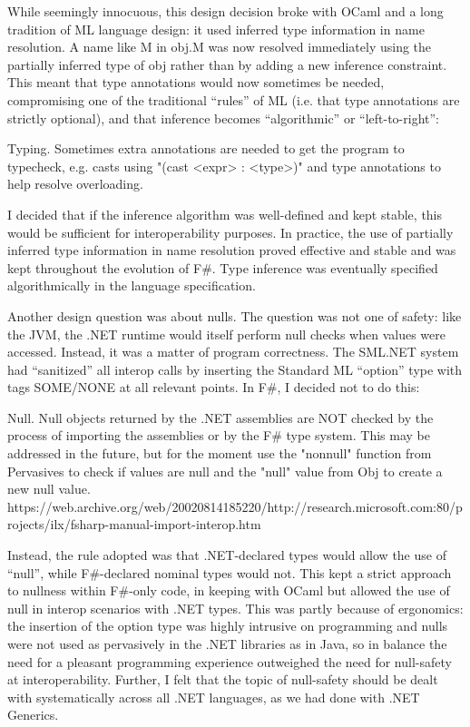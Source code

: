 \documentclass[acmsmall,review]{acmart}\settopmatter{printfolios=true,printccs=false,printacmref=false}
\begin{document}
While seemingly innocuous, this design decision broke with OCaml and a long tradition of ML language design: it used inferred type information in name resolution. A name like M in obj.M was now resolved immediately using the partially inferred type of obj rather than by adding a new inference constraint. This meant that type annotations would now sometimes be needed, compromising one of the traditional “rules” of ML (i.e. that type annotations are strictly optional), and that inference becomes “algorithmic” or “left-to-right”:

\begin{verbquote}
Typing. Sometimes extra annotations are needed to get the program to typecheck, e.g. casts using "(cast <expr> : <type>)" and type annotations to help resolve overloading.
\end{verbquote}

I decided that if the inference algorithm was well-defined and kept stable, this would be sufficient for interoperability purposes. In practice, the use of partially inferred type information in name resolution proved effective and stable and was kept throughout the evolution of F\#.  Type inference was eventually specified algorithmically in the language specification. 

Another design question was about nulls. The question was not one of safety: like the JVM, the .NET runtime would itself perform null checks when values were accessed. Instead, it was a matter of program correctness. The SML.NET system had “sanitized” all interop calls by inserting the Standard ML “option” type with tags SOME/NONE at all relevant points.  In F\#, I decided not to do this:
\begin{verbquote}
Null.  Null objects returned by the .NET assemblies are NOT checked by the process of importing the assemblies or by the F\# type system.  This may be addressed in the future, but for the moment use the "nonnull" function from Pervasives to check if values are null and the "null" value from Obj to create a new null value. https://web.archive.org/web/20020814185220/http://research.microsoft.com:80/projects/ilx/fsharp-manual-import-interop.htm
\end{verbquote}
Instead, the rule adopted was that .NET-declared types would allow the use of “null”, while F\#-declared nominal types would not.  This kept a strict approach to nullness within F\#-only code, in keeping with OCaml but allowed the use of null in interop scenarios with .NET types. This was partly because of ergonomics: the insertion of the option type was highly intrusive on programming and nulls were not used as pervasively in the .NET libraries as in Java, so in balance the need for a pleasant programming experience outweighed the need for null-safety at interoperability. Further, I felt that the topic of null-safety should be dealt with systematically across all .NET languages, as we had done with .NET Generics.   
\end{document}
